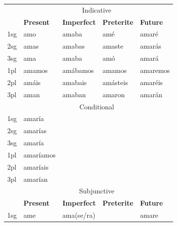 \begin{table}
  \centering
  \begin{tabular}{lllll}
    \lsptoprule
        & \multicolumn{4}{c}{Indicative}                                                  \\
        & \textbf{Present}    & \textbf{Imperfect} & \textbf{Preterite} & \textbf{Future} \\
    \midrule
    1sg & amo                 & amaba              & amé                & amaré           \\
    2sg & amas                & amabas             & amaste             & amarás          \\
    3sg & ama                 & amaba              & amó                & amará           \\
    1pl & amamos              & amábamos           & amamos             & amaremos        \\
    2pl & amáis               & amabais            & amásteis           & amaréis         \\
    3pl & aman                & amaban             & amaron             & amarán          \\
    \midrule
        & \multicolumn{4}{c}{Conditional}                                                 \\
    \midrule
    1sg & amaría                                                                          \\
    2sg & amarías                                                                         \\
    3sg & amaría                                                                          \\
    1pl & amaríamos                                                                       \\
    2pl & amaríais                                                                        \\
    3pl & amarían                                                                         \\
    \midrule
        & \multicolumn{4}{c}{Subjunctive}                                                 \\
        & \textbf{Present}    & \textbf{Imperfect} & \textbf{Preterite} & \textbf{Future} \\
    \midrule
    1sg & ame                 & ama(se/ra)         &                    & amare           \\

\end{tabular}
\end{table}
